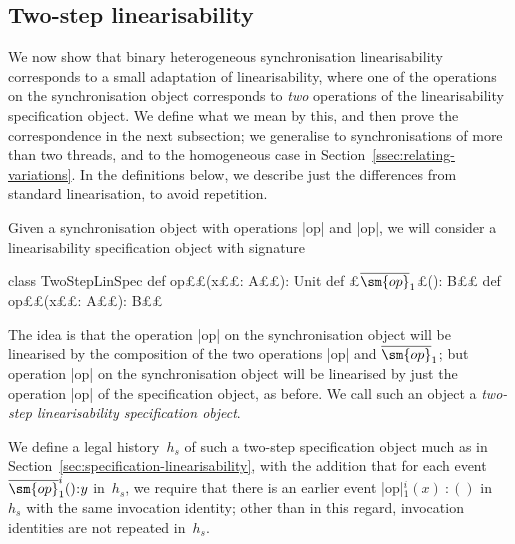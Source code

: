 
\subsection{Two-step linearisability}


We now show that binary heterogeneous synchronisation linearisability
corresponds to a small adaptation of linearisability, where one of the
operations on the synchronisation object corresponds to \emph{two} operations
of the linearisability specification object.  We define what we mean by this,
and then prove the correspondence in the next subsection; we generalise to
synchronisations of more than two threads, and to the homogeneous case in
Section~\ref{ssec:relating-variations}.  In the definitions below, we describe
just the differences from standard linearisation, to avoid repetition.

Given a synchronisation object with operations |op| and |op|,
we will consider a linearisability specification object with signature
%
\begin{scala}
class TwoStepLinSpec{
  def op££(x££: A££): Unit
  def £$\overline{\sm{op}}_1$£(): B££
  def op££(x££: A££): B££
}
\end{scala}
%
The idea is that the operation |op| on the synchronisation object will be
linearised by the composition of the two operations |op| and
$\overline{\sm{op}}_1$; but operation |op| on the synchronisation object
will be linearised by just the operation |op| of the specification object,
as before.  We call such an object a \emph{two-step linearisability
  specification object}.

We define a legal history~$h_s$ of such a two-step specification object much
as in Section~\ref{sec:specification-linearisability}, with the addition that
for each event $\overline{\sm{op}}_1^i()\::y$ in~$h_s$, we require that there
is an earlier event |op|$_1^i(x)\::()$ in~$h_s$ with the same invocation
identity; other than in this regard, invocation identities are not repeated
in~$h_s$.

